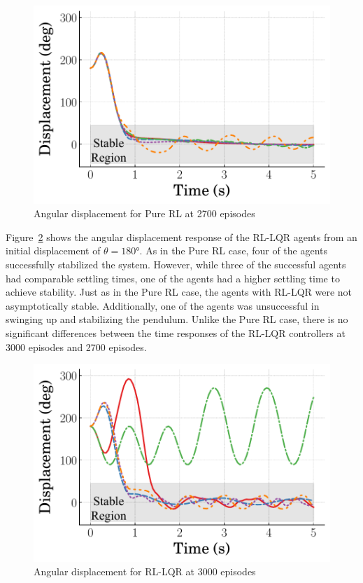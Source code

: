\begin{figure}[t]
    \centering
    \includegraphics[scale=0.65]{figures/figures_RL_model_based_control/Angular_displacement_pure_RL_secondtolast}
    \caption{Angular displacement for Pure RL at 2700 episodes}
    \label{fig:RL_disp2}
\end{figure}

Figure~\ref{fig:RL_LQR_disp} shows the angular displacement response of the RL-LQR agents from an initial displacement of $\theta=180\si{\degree}$. As in the Pure RL case, four of the agents successfully stabilized the system. However, while three of the successful agents had comparable settling times, one of the agents had a higher settling time to achieve stability. Just as in the Pure RL case, the agents with RL-LQR were not asymptotically stable. Additionally, one of the agents was unsuccessful in swinging up and stabilizing the pendulum. Unlike the Pure RL case, there is no significant differences between the time responses of the RL-LQR controllers at 3000 episodes and 2700 episodes.

\begin{figure}[t]
    \centering
    \includegraphics[scale=0.65]{figures/figures_RL_model_based_control/Angular_displacement_RL_LQR}
    \caption{Angular displacement for RL-LQR at 3000 episodes}
    \label{fig:RL_LQR_disp}
\end{figure}

